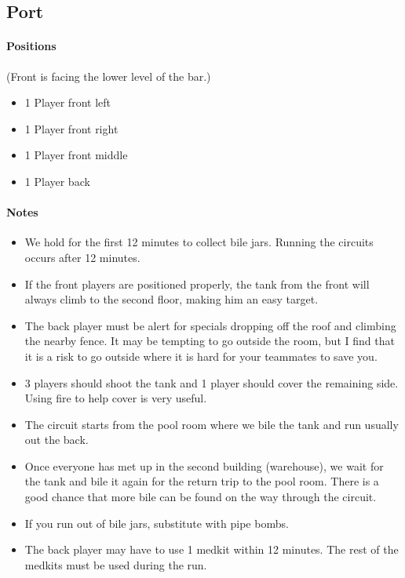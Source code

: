 \subsection{Port}

\paragraph{Positions}(Front is facing the lower level of the bar.)
\begin{itemize}
\item 1 Player front left
\item 1 Player front right
\item 1 Player front middle
\item 1 Player back
\end{itemize}

\paragraph{Notes}
\begin{itemize}
\item We hold for the first 12 minutes to collect bile jars. Running the circuits occurs after 12 minutes.
\item If the front players are positioned properly, the tank from the front will always climb to the second floor, making him an easy target.
\item The back player must be alert for specials dropping off the roof and climbing the nearby fence. It may be tempting to go outside the room, but I find that it is a risk to go outside where it is hard for your teammates to save you.
\item 3 players should shoot the tank and 1 player should cover the remaining side. Using fire to help cover is very useful.
\item The circuit starts from the pool room where we bile the tank and run usually out the back.
\item Once everyone has met up in the second building (warehouse), we wait for the tank and bile it again for the return trip to the pool room. There is a good chance that more bile can be found on the way through the circuit.
\item If you run out of bile jars, substitute with pipe bombs.
\item The back player may have to use 1 medkit within 12 minutes. The rest of the medkits must be used during the run.
\end{itemize}

